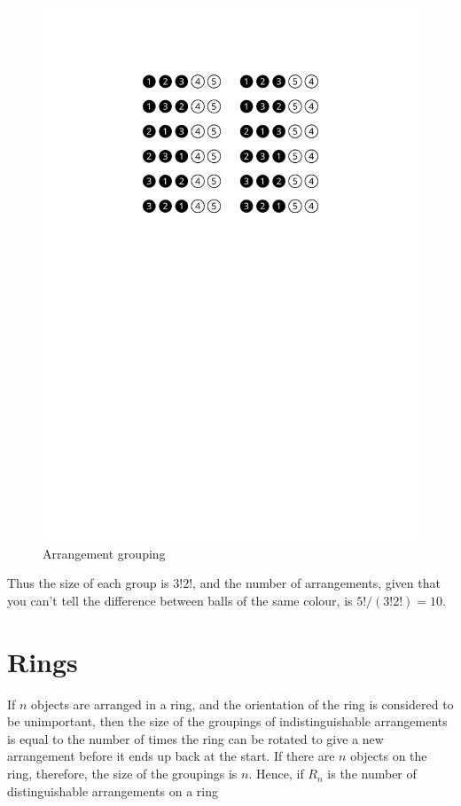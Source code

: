 \documentclass[a5paper]{article}
\begin{document}
\begin{figure}[ht]
  \begin{center}
    \includegraphics{arrangement-grouping}
  \end{center}

  \caption{Arrangement grouping}
  \label{fig:2}
\end{figure}

Thus the size of each group is $3!2!$, and the number of arrangements, given
that you can't tell the difference between balls of the same colour, is
$5!/(3!2!) = 10$.

\section{Rings}

If $n$ objects are arranged in a ring, and the orientation of the ring is
considered to be unimportant, then the size of the groupings of
indistinguishable arrangements is equal to the number of times the ring can be
rotated to give a new arrangement before it ends up back at the start. If there
are $n$ objects on the ring, therefore, the size of the groupings is $n$.
Hence, if $R_n$ is the number of distinguishable arrangements on a ring
\end{document}
